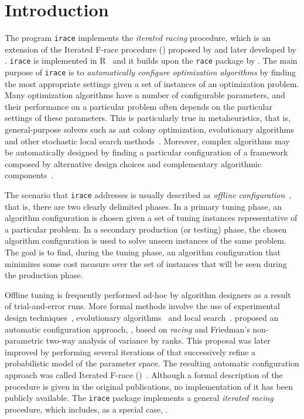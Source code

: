 \documentclass[a4paper]{article}
\newcommand{\irace}{\texttt{irace}\xspace}
\newcommand{\aR}{\textsf{R}\xspace}
\newcommand{\IFRACE}{\text{I/F-Race}\xspace}
\newcommand{\FRACE}{\text{F-Race}\xspace}
\begin{document}
\section{Introduction}

The program \irace implements the \emph{iterated racing} procedure,
which is an extension of the Iterated F-race procedure (\IFRACE)
proposed by \citet{BalBirStu07} and later developed by
\citet{BirYuaBal2010:emaoa}. \irace is implemented in
\aR~\citep{Rmanual} and it builds upon the \texttt{race} package by
\citet{Birattari09tuning,IRIDIA-2003-037}.
%
The main purpose of \irace is to \emph{automatically configure
  optimization algorithms} by finding the most appropriate settings
given a set of instances of an optimization problem. Many optimization
algorithms have a number of configurable parameters, and their
performance on a particular problem often depends on the particular
settings of these parameters. This is particularly true in
metaheuristics, that is, general-purpose solvers such as ant colony
optimization, evolutionary algorithms and other stochastic local
search methods~\citep{HooStu05sls-mk,Birattari09tuning}. Moreover,
complex algorithms may be automatically designed by finding a
particular configuration of a framework composed by alternative design
choices and complementary algorithmic
components~\citep{KhuXuHooLey2009:satenstein,IRIDIA-2011-003}.

The scenario that \irace addresses is usually described as
\emph{offline configuration}~\citep{Birattari09tuning}, that is, there
are two clearly delimited phases. In a primary tuning phase, an
algorithm configuration is chosen given a set of tuning instances
representative of a particular problem. In a secondary production (or
testing) phase, the chosen algorithm configuration is used to solve
unseen instances of the same problem. The goal is to find, during the
tuning phase, an algorithm configuration that minimizes some cost
measure over the set of instances that will be seen during the
production phase.

Offline tuning is frequently performed ad-hoc by algorithm designers
as a result of trial-and-error runs. More formal methods involve the
use of experimental design techniques~\citep{AdeLag06tuning},
evolutionary algorithms~\citep{NanEib2006gecco} and local
search~\citep{HutHooLeyStu2009jair}. \citet{Birattari09tuning} proposed
an automatic configuration approach, \FRACE, based on \emph{racing}
and Friedman's non-parametric two-way analysis of variance by
ranks. This proposal was later improved by performing several
iterations of \FRACE that successively refine a probabilistic model of
the parameter space. The resulting automatic configuration approach
was called Iterated F-race
(\IFRACE)~\citep{BalBirStu07,BirYuaBal2010:emaoa}. Although a formal
description of the \IFRACE procedure is given in the original
publications, no implementation of it has been publicly available.
The \irace package implements a general \emph{iterated racing}
procedure, which includes, as a special case, \IFRACE.
\end{document}
